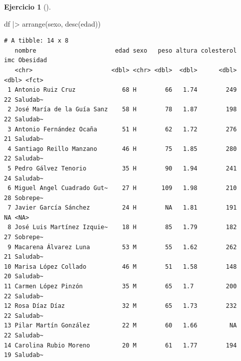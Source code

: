 \documentclass[
  a4paper,
]{scrreport}
\newenvironment{Shaded}{\begin{snugshade}}{\end{snugshade}}
\newcommand{\FunctionTok}[1]{\textcolor[rgb]{0.28,0.35,0.67}{#1}}
\newcommand{\NormalTok}[1]{\textcolor[rgb]{0.00,0.23,0.31}{#1}}
\newcommand{\SpecialCharTok}[1]{\textcolor[rgb]{0.37,0.37,0.37}{#1}}
\theoremstyle{definition}
\newtheorem{exercise}{Ejercicio}[chapter]
\theoremstyle{remark}
\begin{document}
\begin{exercise}[]
\begin{enumerate}
  \begin{tcolorbox}[enhanced jigsaw, coltitle=black, left=2mm, colback=white, leftrule=.75mm, toptitle=1mm, breakable, bottomrule=.15mm, titlerule=0mm, bottomtitle=1mm, title=\textcolor{quarto-callout-tip-color}{\faLightbulb}\hspace{0.5em}{Solución}, arc=.35mm, toprule=.15mm, rightrule=.15mm, colframe=quarto-callout-tip-color-frame, opacityback=0, colbacktitle=quarto-callout-tip-color!10!white, opacitybacktitle=0.6]

\begin{Shaded}
\begin{Highlighting}[]
\NormalTok{df }\SpecialCharTok{|\textgreater{}}
    \FunctionTok{arrange}\NormalTok{(sexo, }\FunctionTok{desc}\NormalTok{(edad))}
\end{Highlighting}
\end{Shaded}

\begin{verbatim}
# A tibble: 14 x 8
   nombre                      edad sexo   peso altura colesterol   imc Obesidad
   <chr>                      <dbl> <chr> <dbl>  <dbl>      <dbl> <dbl> <fct>   
 1 Antonio Ruiz Cruz             68 H        66   1.74        249    22 Saludab~
 2 José María de la Guía Sanz    58 H        78   1.87        198    22 Saludab~
 3 Antonio Fernández Ocaña       51 H        62   1.72        276    21 Saludab~
 4 Santiago Reillo Manzano       46 H        75   1.85        280    22 Saludab~
 5 Pedro Gálvez Tenorio          35 H        90   1.94        241    24 Saludab~
 6 Miguel Angel Cuadrado Gut~    27 H       109   1.98        210    28 Sobrepe~
 7 Javier García Sánchez         24 H        NA   1.81        191    NA <NA>    
 8 José Luis Martínez Izquie~    18 H        85   1.79        182    27 Sobrepe~
 9 Macarena Álvarez Luna         53 M        55   1.62        262    21 Saludab~
10 Marisa López Collado          46 M        51   1.58        148    20 Saludab~
11 Carmen López Pinzón           35 M        65   1.7         200    22 Saludab~
12 Rosa Díaz Díaz                32 M        65   1.73        232    22 Saludab~
13 Pilar Martín González         22 M        60   1.66         NA    22 Saludab~
14 Carolina Rubio Moreno         20 M        61   1.77        194    19 Saludab~
\end{verbatim}

  \end{tcolorbox}
\end{enumerate}

\end{exercise}
\end{document}
